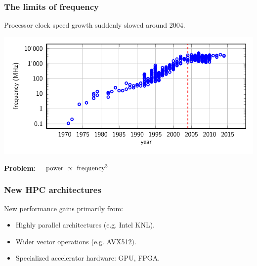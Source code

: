\documentclass[aspectratio=43,12pt]{beamer}
\begin{document}
\begin{frame}
\frametitle{The limits of frequency}

\vfill
Processor clock speed growth suddenly slowed around 2004.

\vfill
\includegraphics[height=0.45\textwidth]{frequency.pdf}

\vfill
\centering
\textbf{Problem:} $\quad\hbox{power}\ \propto\ \hbox{frequency}^3$

\vfill
\end{frame}

\begin{frame}
\frametitle{New HPC architectures}

\vfill
New performance gains primarily from:

\vfill
\begin{itemize}
\item Highly parallel architectures (e.g. Intel KNL).
\item Wider vector operations (e.g. AVX512).
\item Specialized accelerator hardware: GPU, FPGA.
\end{itemize}

\vfill
\end{frame}
\end{document}
